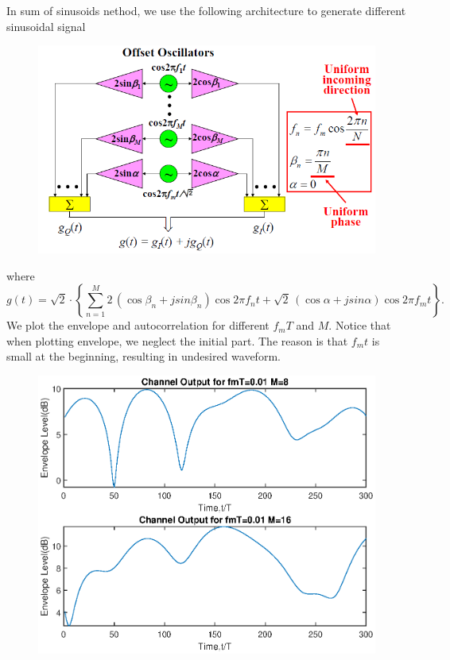 In sum of sinusoids nethod, we use the following architecture to generate different sinusoidal signal
\begin{figure}[H]
    \centering
    \includegraphics[scale = 0.7]{ss.png}
\end{figure}
where 
\begin{equation*}
    g(t) = \sqrt{2} \cdot \left\{\sum_{n=1}^M 2\,(\cos\beta_n + j sin \beta_n)\cos2\pi f_nt + \sqrt{2} \, (\cos\alpha + j sin \alpha)\cos2\pi f_mt\right\}.
\end{equation*}
We plot the envelope and autocorrelation for different $f_mT$ and $M$. Notice that when plotting 
envelope, we neglect the initial part. The reason is that $f_mt$ is small at the beginning, 
resulting in undesired waveform.
\begin{figure}[H]
    \centering
    \includegraphics[scale = 0.9]{ss_envelop_001.eps}
\end{figure}

